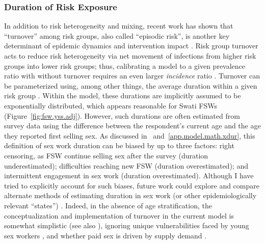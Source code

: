 \subsubsection{Duration of Risk Exposure}\label{model.disc.par.dur}
In addition to risk heterogeneity and mixing, recent work has shown that
``turnover'' among risk groups, also called ``episodic risk'', is another key determinant of
epidemic dynamics and intervention impact \cite{Henry2015,Knight2020}.
Risk group turnover acts to reduce risk heterogeneity via
net movement of infections from higher risk groups into lower risk groups;
thus, calibrating a model to a given prevalence ratio with \vs without turnover
requires an even larger \emph{incidence} ratio \cite{Knight2020}.
Turnover can be parameterized using, among other things,
the average duration within a given risk group \cite{Knight2020}.
Within the model, these durations are implicitly assumed to be exponentially distributed,
which appears reasonable for Swati FSWs \cite{Baral2014,EswKP2014} (Figure~\ref{fig:fsw.yss.adj}).
However, such durations are often estimated from survey data using the difference between
the respondent's current age and the age they reported first selling sex.
As discussed in ~and~\ref{app.model.math.xdur},
this definition of sex work duration can be biased by up to three factors:
right censoring, as FSW continue selling sex after the survey (duration underestimated);
difficulties reaching new FSW \cite{Cheuk2020} (duration overestimated);
and intermittent engagement in sex work (duration overestimated).
Although I have tried to explicitly account for such biases,
future work could explore and compare alternate methods of estimating
duration in sex work (or other epidemiologically relevant ``states'') \cite{Fazito2012}.
Indeed, in the absence of age stratification,
the conceptualization and implementation of turnover in the current model is somewhat simplistic
(see also ), ignoring
unique vulnerabilities faced by young sex workers \cite{Cheuk2020}, and
whether paid sex is driven by supply \vs demand \cite{Garnett1993,Steen2019}.
